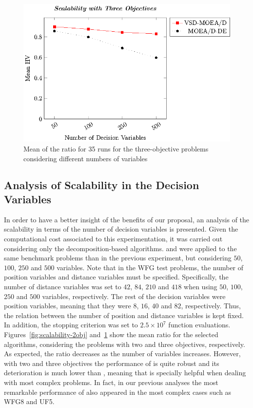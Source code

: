 \begin{figure}[t]
\centering
\includegraphics[scale=0.75]{images/Graphic-Scalability-3obj_tikz-figure0.eps}
\caption{Mean of the \HV{} ratio for 35 runs for the three-objective problems considering different numbers of variables} \label{fig:scalability-3obj}
\end{figure}

\subsection{Analysis of Scalability in the Decision Variables}

In order to have a better insight of the benefits of our proposal, an analysis of the scalability in terms of the number 
of decision variables is presented.
%
Given the computational cost associated to this experimentation, it was carried out considering only 
the decomposition-based algorithms.
%
\AVSDMOEAD{} and \MOEAD{} were applied to the same benchmark problems than in the previous experiment, 
but considering $50$, $100$, $250$ and $500$ variables.
%
Note that in the WFG test problems, the number of position variables and distance variables must be specified.
%
Specifically, the number of distance variables was set to $42$, $84$, $210$ and $418$ when using $50$, $100$, $250$ and $500$ 
variables, respectively.
%
The rest of the decision variables were position variables, meaning that they were $8$, $16$, $40$ and $82$, respectively.
%
Thus, the relation between the number of position and distance variables is kept fixed.
%
In addition, the stopping criterion was set to $2.5 \times 10^7$ function evaluations.
%
Figures~\ref{fig:scalability-2obj} and~\ref{fig:scalability-3obj} show the mean \HV{} ratio for the selected algorithms, 
considering the problems with two and three objectives, respectively.
%
As expected, the \HV{} ratio decreases as the number of variables increases.
%
However, with two and three objectives the performance of \AVSDMOEAD{} is quite robust and its deterioration is much lower than \MOEADDE{},
meaning that \AVSDMOEAD{} is specially helpful when dealing with most complex problems.
%
In fact, in our previous analyses the most remarkable performance of \AVSDMOEAD{} also appeared in the most complex cases such
as WFG8 and UF5.
%



